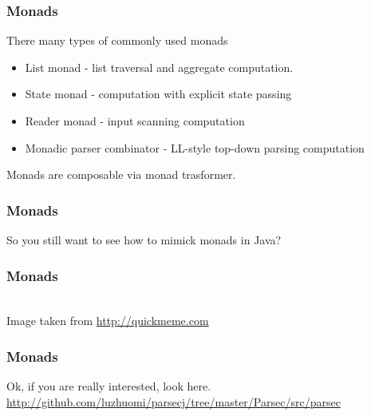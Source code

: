 \documentclass{beamer}
\begin{document}
\begin{frame}[fragile]
\frametitle{Monads}
There many types of commonly used monads
\begin{itemize}
 \item List monad - list traversal and aggregate computation.
 \item State monad - computation with explicit state passing
 \item Reader monad - input scanning computation
 \item Monadic parser combinator - LL-style top-down parsing computation 
\end{itemize}
Monads are composable via monad trasformer. 
\end{frame}


\begin{frame}[fragile]
\frametitle{Monads}
So you still want to see how to mimick monads in Java?

\end{frame}


\begin{frame}[fragile]
\frametitle{Monads}
\\
{\scriptsize Image taken from \url{http://quickmeme.com}}

\end{frame}


\begin{frame}[fragile]
\frametitle{Monads}

Ok, if you are really interested, look here. \\
\url{http://github.com/luzhuomi/parsecj/tree/master/Parsec/src/parsec}

\end{frame}
\end{document}
